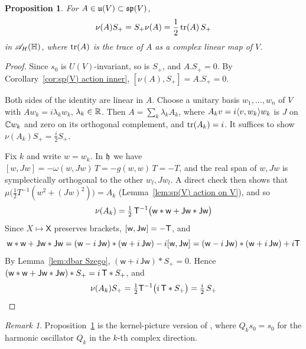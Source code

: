 \documentclass[11pt]{amsart}
\theoremstyle{plain}
\newtheorem{proposition}[theorem]{Proposition}
\theoremstyle{definition}
\theoremstyle{remark}
\newtheorem{remark}[theorem]{Remark}
\begin{document}
\begin{proposition}\label{prop:vacuum curvature}
For $A\in\mathfrak{u}(V)\subset \mathfrak{sp}(V)$,
\[ \nu(A)S_+=S_+\nu(A)=\frac12\operatorname{tr}(A)\,S_+\]
in ${\mathscr{A}}_H(\mathbb{H})$, where $\operatorname{tr}(A)$ is the trace of $A$ as a complex linear map of $V$.
\end{proposition}
\begin{proof}
Since $s_0$ is $U(V)$-invariant, so is $S_+$, and $A.S_+=0$.
By Corollary~\ref{cor:sp(V) action inner}, $[\nu(A),S_+]=A.S_+=0$.

Both sides of the identity are linear in $A$.
Choose a unitary basis $w_1,\dots,w_n$ of $V$ with $Aw_k=i\lambda_kw_k$, $\lambda_k\in{\mathbb{R}}$.
Then $A=\sum_k\lambda_kA_k$, where $A_kv=i\langle v,w_k \rangle w_k$ is $J$ on ${\mathbb{C}} w_k$ and zero on its orthogonal complement, and $\operatorname{tr}(A_k)=i$.
It suffices to show $\nu(A_k)S_+=\frac i2S_+$.

Fix $k$ and write $w=w_k$.
In $\mathfrak{h}$ we have $[w,Jw]=-\omega(w,Jw)\,T=-g(w,w)\,T=-T$, and the real span of $w,Jw$ is symplectically orthogonal to the other $w_l,Jw_l$.
A direct check then shows that $\mu\bigl(\frac12T^{-1}(w^2+(Jw)^2)\bigr)=A_k$ (Lemma~\ref{lem:sp(V) action on V}), and so
\[ \nu(A_k)=\tfrac12\,\mathsf{T}^{-1}\bigl(\mathsf w*\mathsf w+\mathsf{Jw}*\mathsf{Jw}\bigr)\]
Since $X\mapsto\mathsf X$ preserves brackets, $[\mathsf w,\mathsf{Jw}]=-\mathsf{T}$, and
\[ \mathsf w*\mathsf w+\mathsf{Jw}*\mathsf{Jw}=(\mathsf w-i\,\mathsf{Jw})*(\mathsf w+i\,\mathsf{Jw})-i[\mathsf w,\mathsf{Jw}]=(\mathsf w-i\,\mathsf{Jw})*(\mathsf w+i\,\mathsf{Jw})+i\mathsf{T}\]
By Lemma~\ref{lem:dbar Szego}, $(\mathsf w+i\,\mathsf{Jw})*S_+=0$.
Hence $(\mathsf w*\mathsf w+\mathsf{Jw}*\mathsf{Jw})*S_+=i\,\mathsf{T}*S_+$, and
\[ \nu(A_k)S_+=\tfrac12\mathsf{T}^{-1}\bigl(i\,\mathsf{T}*S_+\bigr)=\tfrac i2\,S_+\]

\end{proof}

\begin{remark}\label{rem:vacuum curvature GvE20}
Proposition~\ref{prop:vacuum curvature} is the kernel-picture version of \cite[Lemma~7.3]{GvE20}, where $Q_ks_0=s_0$ for the harmonic oscillator $Q_k$ in the $k$-th complex direction.
\end{remark}
\end{document}
